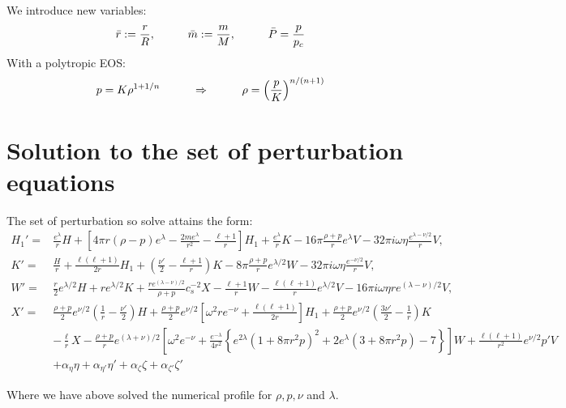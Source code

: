 \documentclass[10pt,oneside,headheight=10mm]{article}
\newcommand{\cb}[1]{\left(#1\right)}
\numberwithin{equation}{section}
\begin{document}
We introduce new variables:
\begin{align}
    \bar{r} :=\frac{r}{R}, \hspace{1cm}\bar{m} :=\frac{m}{M},\hspace*{1cm}\bar{P} = \frac{p}{p_c}
\end{align}
With a polytropic EOS:
\begin{align}
    p = K\rho^{1+1/n} \hspace*{1cm} \Rightarrow\hspace*{1cm} \rho = \cb{\frac{p}{K}}^{n/(n+1)}
\end{align}



\section{Solution to the set of perturbation equations}
The set of perturbation so solve attains the form:
\begin{align}
H_1'=&\frac{e^\lambda}{r} H+\left[4\pi r \left(\rho-p\right)e^\lambda -\frac{2m e^\lambda}{r^2}-\frac{\ell+1}{r}\right]H_1+\frac{e^\lambda}{r} K-16 \pi\frac{\rho+p}{r}e^\lambda V-32\pi i  \omega \eta \frac{e^{\lambda-\nu/2}}{r}V,\label{eq:eqforH1}\\
K'=&\frac{H}{r}+\frac{\ell\left(\ell+1\right)}{2r}H_1+\left(\frac{\nu'}{2}-\frac{\ell+1}{r}\right)K-8\pi\frac{\rho+p}{r}e^{\lambda/2} W-32\pi i\omega \eta \frac{e^{-\nu/2}}{r}V,\label{eq:eqforK}\\
W'=&\frac{r}{2}e^{\lambda/2}H+r e^{\lambda/2}K+\frac{r e^{(\lambda-\nu)/2}}{\rho+p}c_s^{-2}X-\frac{\ell+1}{r}W -\frac{\ell\left(\ell+1\right)}{r}e^{\lambda/2}V-16 \pi i \omega \eta r e^{(\lambda-\nu)/2}V,\label{eq:eqforW}\\
X'=&\frac{\rho+p}{2}e^{\nu/2}\left(\frac{1}{r}-\frac{\nu'}{2}\right)H+\frac{\rho+p}{2}e^{\nu/2}\left[\omega^2 r e^{-\nu}+\frac{\ell\left(\ell+1\right)}{2r}\right]H_1+\frac{\rho+p}{2}e^{\nu/2}\left(\frac{3\nu'}{2}-\frac{1}{r}\right)K  \nonumber\\
&-\frac{\ell}{r}X-\frac{\rho+p}{r}e^{(\lambda+\nu)/2}\left[\omega^2 e^{-\nu}+\frac{e^{-\lambda}}{4r^2}\left\{e^{2\lambda}\left(1+8\pi r^2 p \right)^2+2e^\lambda\left(3+8\pi r^2 p \right)-7\right\}\right]W+\frac{\ell\left(\ell+1\right)}{r^2}e^{\nu/2}p' V \label{eq:eqforpX}\\
&+\alpha_\eta \eta+\alpha_{\eta'} \eta'+\alpha_\zeta \zeta+\alpha_{\zeta'} \zeta'\nonumber
\end{align}

Where we have above solved the numerical profile for $\rho, p, \nu$ and $\lambda$.
\end{document}
